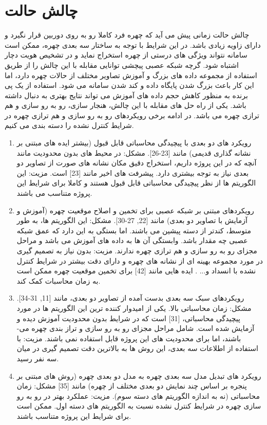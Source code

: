 \section{چالش حالت}
چالش حالت زمانی پیش می آید که چهره فرد کاملا رو به روی دوربین قرار نگیرد و دارای زاویه زیادی باشد. در این شرایط با توجه به ساختار سه بعدی چهره، ممکن است سامانه نتواند ویژگی های درستی از چهره استخراج نماید و در تشخیص هویت دچار اشتباه شود. گرچه شبکه عصبی پیچشی توانایی مقابله با این چالش را از طریق استفاده از مجموعه داده های بزرگ و آموزش تصاویر مختلف از حالات چهره دارد، اما این کار باعث بزرگ شدن پایگاه داده و کند شدن سامانه می شود. استفاده از یک پی برنده  به منظور کاهش حجم داده های آموزش می تواند نتایج بهتری به دنبال داشته باشد. یکی از راه  حل های مقابله با این چالش، هنجار سازی، رو به رو سازی  و هم ترازی  چهره می باشد. در ادامه برخی رویکردهای رو به رو سازی و هم ترازی چهره در شرایط کنترل نشده را دسته بندی می کنیم.

\begin{enumerate}
\item
رویکرد های دو بعدی با پیچیدگی محاسباتی قابل قبول (بیشتر ایده های مبتنی بر نشانه گذاری  قدیمی) مانند [23-26].
\noindent
مشکل: در محیط های بدون محدودیت مانند آنچه که در این پروژه داریم، استخراج دقیق مکان نشانه های صورت از تصاویر دو بعدی نیاز به توجه بیشتری دارد. پیشرفت های اخیر مانند [23] است.
\noindent
مزیت: این الگوریتم ها از نظر پیچیدگی محاسباتی  قابل قبول هستند و کاملا برای شرایط این پروژه متناسب می باشند.
\item 
رویکردهای مبتنی بر شبکه عصبی برای تخمین و اصلاح موقعیت چهره (آموزش و آزمایش با تصاویر دو بعدی) مانند [22, 27-30].
\noindent
مشکل: این الگوریتم ها، به طور متوسط، کندتر از دسته پیشین می باشند. اما بستگی به این دارد که عمق شبکه عصبی چه مقدار باشد. وابستگی آن ها به داده های آموزش می باشد و مراحل مجزای رو به رو سازی و هم ترازی چهره ندارند.
\noindent
مزیت: بدون نیاز به تصمیم گیری در مورد مجموعه بهینه ای از نشانه های چهره و دارای دقت بیشتر در شرایط کنترل نشده با انسداد و... . ایده هایی مانند [42] برای تخمین موقعیت چهره ممکن است به زمان محاسبات کمک کند.
\item

رویکردهای سبک سه بعدی بدست آمده از تصاویر دو بعدی، مانند [11, 31-34].
\noindent
مشکل: زمان محاسباتی بالا. یکی از امیدوار کننده ترین این الگوریتم ها در مورد پیچیدگی محاسباتی، [31] است که در شرایط بدون محدودیت آموزش دیده و آزمایش شده است. شامل مراحل مجزای رو به رو سازی و تراز بندی چهره می-باشند، اما برای محدودیت های این پروژه قابل استفاده نمی باشند.
\noindent
مزیت: با استفاده از اطلاعات سه بعدی، این روش ها به بالاترین دقت تصمیم گیری در میان سه نفر رسید.
\item
رویکرد های تبدیل مدل سه بعدی چهره به مدل دو بعدی چهره (روش های مبتنی بر پنجره  بر اساس چند نمایش دو بعدی مختلف از چهره) مانند [35]
\noindent
مشکل: زمان محاسباتی (نه به اندازه الگوریتم های دسته سوم). 
\noindent
مزیت: عملکرد بهتر در رو به رو سازی چهره در شرایط کنترل نشده نسبت به الگوریتم های دسته اول. ممکن است برای شرایط این پروژه متناسب باشند.
\end{enumerate}


